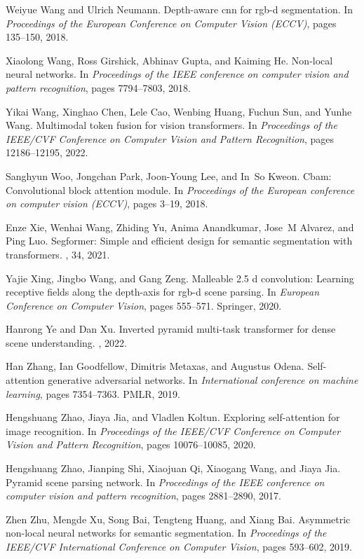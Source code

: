 \documentclass[10pt,twocolumn,letterpaper]{article}
\begin{document}
\begin{thebibliography}{10}
Weiyue Wang and Ulrich Neumann.
\newblock Depth-aware cnn for rgb-d segmentation.
\newblock In {\em Proceedings of the European Conference on Computer Vision
  (ECCV)}, pages 135--150, 2018.

Xiaolong Wang, Ross Girshick, Abhinav Gupta, and Kaiming He.
\newblock Non-local neural networks.
\newblock In {\em Proceedings of the IEEE conference on computer vision and
  pattern recognition}, pages 7794--7803, 2018.

Yikai Wang, Xinghao Chen, Lele Cao, Wenbing Huang, Fuchun Sun, and Yunhe Wang.
\newblock Multimodal token fusion for vision transformers.
\newblock In {\em Proceedings of the IEEE/CVF Conference on Computer Vision and
  Pattern Recognition}, pages 12186--12195, 2022.

Sanghyun Woo, Jongchan Park, Joon-Young Lee, and In~So Kweon.
\newblock Cbam: Convolutional block attention module.
\newblock In {\em Proceedings of the European conference on computer vision
  (ECCV)}, pages 3--19, 2018.

Enze Xie, Wenhai Wang, Zhiding Yu, Anima Anandkumar, Jose~M Alvarez, and Ping
  Luo.
\newblock Segformer: Simple and efficient design for semantic segmentation with
  transformers.
, 34, 2021.

Yajie Xing, Jingbo Wang, and Gang Zeng.
\newblock Malleable 2.5 d convolution: Learning receptive fields along the
  depth-axis for rgb-d scene parsing.
\newblock In {\em European Conference on Computer Vision}, pages 555--571.
  Springer, 2020.

Hanrong Ye and Dan Xu.
\newblock Inverted pyramid multi-task transformer for dense scene
  understanding.
, 2022.

Han Zhang, Ian Goodfellow, Dimitris Metaxas, and Augustus Odena.
\newblock Self-attention generative adversarial networks.
\newblock In {\em International conference on machine learning}, pages
  7354--7363. PMLR, 2019.

Hengshuang Zhao, Jiaya Jia, and Vladlen Koltun.
\newblock Exploring self-attention for image recognition.
\newblock In {\em Proceedings of the IEEE/CVF Conference on Computer Vision and
  Pattern Recognition}, pages 10076--10085, 2020.

Hengshuang Zhao, Jianping Shi, Xiaojuan Qi, Xiaogang Wang, and Jiaya Jia.
\newblock Pyramid scene parsing network.
\newblock In {\em Proceedings of the IEEE conference on computer vision and
  pattern recognition}, pages 2881--2890, 2017.

Zhen Zhu, Mengde Xu, Song Bai, Tengteng Huang, and Xiang Bai.
\newblock Asymmetric non-local neural networks for semantic segmentation.
\newblock In {\em Proceedings of the IEEE/CVF International Conference on
  Computer Vision}, pages 593--602, 2019.

\end{thebibliography}
\end{document}
